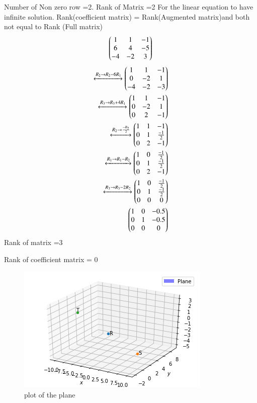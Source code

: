 \documentclass[journal,12pt,twocolumn]{IEEEtran}
\begin{document}
Number of Non zero row =2.
Rank of Matrix =2
For the linear equation to have infinite solution.
Rank(coefficient matrix) = Rank(Augmented matrix)and both not equal to  Rank (Full matrix)
\begin{align}
\begin{pmatrix}1 & 1 & -1\\6 & 4 & -5\\-4 & -2 & 3\end{pmatrix}
\end{align}
\begin{align}
\xleftrightarrow{R_2\rightarrow{R_2-6R_1}}
\begin{pmatrix}1 & 1 & -1\\0 & -2 & 1\\-4 & -2 &-3\end{pmatrix}
\\
\xleftrightarrow{R_3\rightarrow{R_3+4R_1}}
\begin{pmatrix}1 & 1 & -1\\0 & -2 & 1\\0 & 2 & -1\end{pmatrix}
\\
\xleftrightarrow{R_2\rightarrow\frac{-R_2}{2}}\begin{pmatrix}1 & 1 & -1\\0 & 1 & \frac{-1}{2}\\0 & 2 & -1\end{pmatrix}
\\
\xleftrightarrow{R_1\rightarrow{R_1-R_2}}\begin{pmatrix}1 & 0 & \frac{-1}{2}\\0 & 1 & \frac{-1}{2}\\0 & 2 & -1\end{pmatrix}
\\
\xleftrightarrow{R_3\rightarrow{R_3-2R_2}}
\begin{pmatrix}1 & 0 & \frac{-1}{2}\\0 & 1 & \frac{-1}{2}\\0 & 0 & 0\end{pmatrix}
\\
\begin{pmatrix}1 & 0 & -0.5\\0 & 1 & -0.5\\0 & 0 & 0\end{pmatrix}
\end{align}
Rank of matrix =3

Rank of coefficient matrix = 0
\begin{figure}[ht]
\centering
\includegraphics[width=\columnwidth]{figure.png}
\caption{plot of the plane}
\label{Plot of the plane}
\end{figure}
\end{document}
